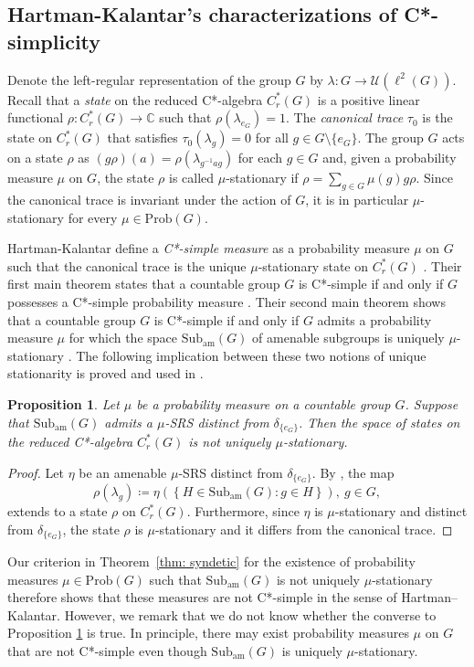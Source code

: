 \documentclass[reqno,a4paper,11pt]{amsart}
\numberwithin{equation}{section}
\newcommand{\1}{\mathbf{1}}
\newcommand{\subam}[1]{\mathrm{Sub}_{\mathrm{am}}(#1)}
\newtheorem{prop}[teo]{Proposition}
\theoremstyle{definition}
\begin{document}
\subsection*{Hartman-Kalantar's characterizations of C*-simplicity}
Denote the left-regular representation of the group $G$ by $\lambda:G\to \mathcal{U}(\ell^2(G))$. Recall that a \emph{state} on the reduced C*-algebra $C_r^*(G)$ is a positive linear functional $\rho:C_r^*(G)\to \mathbb{C}$ such that $\rho(\lambda_{e_G})=1$. The \emph{canonical trace} $\tau_0$ is the state on $C_r^*(G)$ that satisfies $\tau_0(\lambda_g)=0$ for all $g\in G\setminus \{e_G\}$. The group $G$ acts on a state $\rho$ as $(g\rho)(a)=\rho(\lambda_{g^{-1}ag})$ for each $g\in G$ and, given a probability measure $\mu$ on $G$, the state $\rho$ is called $\mu$-stationary if $\rho=\sum_{g\in G}\mu(g) g\rho$. Since the canonical trace is invariant under the action of $G$, it is in particular $\mu$-stationary for every $\mu\in \mathrm{Prob}(G)$.

Hartman-Kalantar define a \emph{C*-simple measure} as a probability measure $\mu$ on $G$ such that the canonical trace is the unique $\mu$-stationary state on $C_r^*(G)$ \cite[Definition at the top of page 4]{HartmanKalantar2022}. Their first main theorem states that a countable group $G$ is C*-simple if and only if $G$ possesses a C*-simple probability measure \cite[Theorem 5.2]{HartmanKalantar2022}. Their second main theorem shows that a countable group $G$ is C*-simple if and only if $G$ admits a probability measure $\mu$ for which the space $\subam{G}$ of amenable subgroups is uniquely $\mu$-stationary \cite[Corollary 5.7]{HartmanKalantar2022}. The following implication between these two notions of unique stationarity is proved and used in \cite{HartmanKalantar2022}.

\begin{prop}\label{prop: implication c simple}
	Let $\mu$ be a probability measure on a countable group $G$. Suppose that $\subam{G}$ admits a $\mu$-SRS distinct from $\delta_{\{e_G\}}$. Then the space of states on the reduced C*-algebra $C_r^{*}(G)$ is not uniquely $\mu$-stationary.
\end{prop}
\begin{proof}
	Let $\eta$ be an amenable $\mu$-SRS distinct from $\delta_{\{e_G\}}$. By \cite[Lemma 2.3]{HartmanKalantar2022}, the map
	\[
	\rho(\lambda_g)\coloneqq \eta\left( \left\{H\in \subam{G} : g\in H\right\}\right), \ g\in G,
	\]
	extends to a state $\rho$ on $C_r^*(G)$. Furthermore, since $\eta$ is $\mu$-stationary and distinct from $\delta_{\{e_G\}}$, the state $\rho$ is $\mu$-stationary and it differs from the canonical trace.
\end{proof}
Our criterion in Theorem~\ref{thm: syndetic} for the existence of probability measures $\mu\in \mathrm{Prob}(G)$ such that $\subam{G}$ is not uniquely $\mu$-stationary therefore shows that these measures are not C*-simple in the sense of Hartman–Kalantar.
However, we remark that we do not know whether the converse to Proposition \ref{prop: implication c simple} is true. In principle, there may exist probability measures $\mu$ on $G$ that are not C*-simple even though $\subam{G}$ is uniquely $\mu$-stationary.
\end{document}
